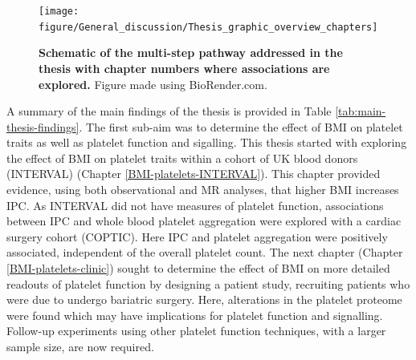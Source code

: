 \documentclass[11pt,twoside]{bristolthesis}
\begin{document}
\begin{figure}

{\centering \texttt{[image: figure/General\_discussion/Thesis\_graphic\_overview\_chapters]} 

}

\caption[Schematic of the multi-step pathway addressed in the thesis with chapter numbers where associations are explored]{\textbf{Schematic of the multi-step pathway addressed in the thesis with chapter numbers where associations are explored.} Figure made using BioRender.com.}\label{fig:Thesis-schematic-chaps}
\end{figure}
A summary of the main findings of the thesis is provided in Table \ref{tab:main-thesis-findings}. The first sub-aim was to determine the effect of BMI on platelet traits as well as platelet function and sigalling. This thesis started with exploring the effect of BMI on platelet traits within a cohort of UK blood donors (INTERVAL) (Chapter \ref{BMI-platelets-INTERVAL}). This chapter provided evidence, using both observational and MR analyses, that higher BMI increases IPC. As INTERVAL did not have measures of platelet function, associations between IPC and whole blood platelet aggregation were explored with a cardiac surgery cohort (COPTIC). Here IPC and platelet aggregation were positively associated, independent of the overall platelet count. The next chapter (Chapter \ref{BMI-platelets-clinic}) sought to determine the effect of BMI on more detailed readouts of platelet function by designing a patient study, recruiting patients who were due to undergo bariatric surgery. Here, alterations in the platelet proteome were found which may have implications for platelet function and signalling. Follow-up experiments using other platelet function techniques, with a larger sample size, are now required.
\end{document}
